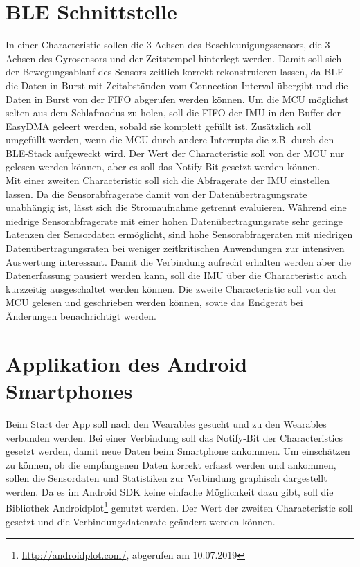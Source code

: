 \section{BLE Schnittstelle}
In einer Characteristic sollen die 3 Achsen des Beschleunigungssensors, die 3 Achsen des Gyrosensors und der Zeitstempel hinterlegt werden.
Damit soll sich der Bewegungsablauf des Sensors zeitlich korrekt rekonstruieren lassen, da BLE die Daten in Burst mit Zeitabständen vom Connection-Interval übergibt und die Daten in Burst von der FIFO abgerufen werden können.
Um die MCU möglichst selten aus dem Schlafmodus zu holen, soll die FIFO der IMU in den Buffer der EasyDMA geleert werden, sobald sie komplett gefüllt ist.
Zusätzlich soll umgefüllt werden, wenn die MCU durch andere Interrupts die z.B. durch den BLE-Stack aufgeweckt wird.
Der Wert der Characteristic soll von der MCU nur gelesen werden können, aber es soll das Notify-Bit gesetzt werden können.\\
Mit einer zweiten Characteristic soll sich die Abfragerate der IMU einstellen lassen.
Da die Sensorabfragerate damit von der Datenübertragungsrate unabhängig ist, lässt sich die Stromaufnahme getrennt evaluieren.
Während eine niedrige Sensorabfragerate mit einer hohen Datenübertragungsrate sehr geringe Latenzen der Sensordaten ermöglicht, sind hohe Sensorabfrageraten mit niedrigen Datenübertragungsraten bei weniger zeitkritischen Anwendungen zur intensiven Auswertung interessant.
Damit die Verbindung aufrecht erhalten werden aber die Datenerfassung pausiert werden kann, soll die IMU über die Characteristic auch kurzzeitig ausgeschaltet werden können.
Die zweite Characteristic soll von der MCU gelesen und geschrieben werden können, sowie das Endgerät bei Änderungen benachrichtigt werden.

\section{Applikation des Android Smartphones}
Beim Start der App soll nach den Wearables gesucht und zu den Wearables verbunden werden.
Bei einer Verbindung soll das Notify-Bit der Characteristics gesetzt werden, damit neue Daten beim Smartphone ankommen.
Um einschätzen zu können, ob die empfangenen Daten korrekt erfasst werden und ankommen, sollen die Sensordaten und Statistiken zur Verbindung graphisch dargestellt werden.
Da es im Android SDK keine einfache Möglichkeit dazu gibt, soll die Bibliothek Androidplot\footnote{\url{http://androidplot.com/}, abgerufen am 10.07.2019} genutzt werden.
Der Wert der zweiten Characteristic soll gesetzt und die Verbindungsdatenrate geändert werden können.
